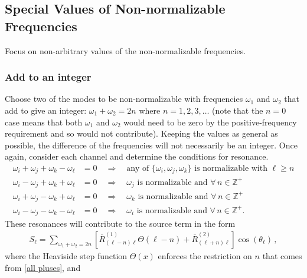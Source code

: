 \documentclass[letterpaper,11pt]{article}
\newcommand{\oi}{\omega_i}
\newcommand{\oj}{\omega_j}
\newcommand{\ok}{\omega_k}
\newcommand{\ol}{\omega_\ell}
\newcommand{\thl}{\theta_\ell}
\begin{document}
\subsection{Special Values of Non-normalizable Frequencies}

Focus on non-arbitrary values of the non-normalizable frequencies.

\subsubsection{Add to an integer}
\label{ssec: add to integer}

Choose two of the modes to be non-normalizable with frequencies $\omega_1$ and $\omega_2$ that add to give an integer: $\omega_1 + \omega_2 = 2n$ where $n = 1, 2, 3, \ldots$ (note that the $n = 0$ case means that both $\omega_1$ and $\omega_2$ would need to be zero by the positive-frequency requirement and so would not contribute). Keeping the values as general as possible, the difference of the frequencies will not necessarily be an integer. Once again, consider each channel and determine the conditions for resonance.
\begin{align}
\label{all pluses}
\oi + \oj + \ok - \ol &= 0 \quad \Rightarrow \quad \text{any of $\{\oi, \oj, \ok\}$ is normalizable with $\ell \geq n$} \\
\oi - \oj + \ok + \ol &= 0 \quad \Rightarrow \quad \text{$\oj$ is normalizable and $\forall \, n \in \mathbb{Z}^+$} \\
\oi + \oj - \ok + \ol &= 0 \quad \Rightarrow \quad \text{$\ok$ is normalizable and $\forall \,  n \in \mathbb{Z}^+$} \\
\oi - \oj - \ok - \ol &= 0 \quad \Rightarrow \quad \text{$\oi$ is normalizable and $\forall \, n \in \mathbb{Z}^+$.}
\end{align}
These resonances will contribute to the source term in the form
\begin{align}
S_\ell = \sum_{\omega_1 + \omega_2 = 2n} \left[ \overline{R}^{(1)}_{(\ell - n) \ell} \Theta \left( \ell - n \right) + \overline{R}^{(2)}_{(\ell + n) \ell } \right]\cos(\thl) \, ,
\end{align}
where the Heaviside step function $\Theta(x)$ enforces the restriction on $n$ that comes from \eqref{all pluses}, and
\end{document}
